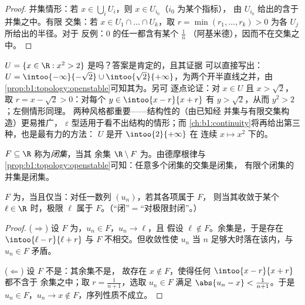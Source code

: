 \begin{proof}
并集情形：若 $x \in \bigcup_i U_i$，则 $x \in U_{i_0}$（$i_0$ 为某个指标），
由 $U_{i_0}$ 给出的含于并集之中。有限
交集：若 $x \in U_1 \cap \dots \cap U_k$，取 $r = \min(r_1,
\dots, r_k) > 0$ 为各 $U_j$ 所给出的半径。对于
反例：$0$ 的任一都含有某个 $\frac{1}{n}$
（阿基米德），因而不在交集之中。
\end{proof}

\begin{example}[用显式半径验证开性]\label{ex:b1:topology:radii}
$U = \{x \in \R : x^2 > 2\}$ 是吗？答案是肯定的，且其证据
可以直接写出：$U = \intoo{-\infty}{-\sqrt2} \cup
\intoo{\sqrt2}{+\infty}$，为两个开半直线之并，由
\cref{prop:b1:topology:openstable}可知其为。另可
逐点论证：对 $x \in U$ 且 $x > \sqrt 2$，取 $r = x -
\sqrt2 > 0$：对每个 $y \in \intoo{x - r}{x + r}$ 有 $y >
\sqrt 2$，从而 $y^2 > 2$；左侧情形同理。
两种风格都重要——结构性的（由已知经
并集与有限交集构造）更易推广，
$\varepsilon$ 型适用于看不出结构的情形；而
\cref{ch:b1:continuity}将再给出第三种，也是最有力的方法：
$U$ 是开 $\intoo{2}{+\infty}$ 在
连续 $x \mapsto x^2$ 下的。
\end{example}

\begin{definition}[闭集]\label{def:b1:topology:closed}
 $F \subseteq \R$ 称为\emph{闭集}，当其
余集 $\R \setminus F$ 为。由德摩根律与
\cref{prop:b1:topology:openstable}可知：任意多个闭集的交集是闭集，
有限个闭集的并集是闭集。
\end{definition}

\begin{theorem}[闭集的序列刻画]\label{thm:b1:topology:seqclosed}
$F$ 为，当且仅当：对任一数列 $(u_n)$，若其各项属于 $F$，
则当其收敛于某个 $\ell \in \R$ 时，极限 $\ell$ 属于
$F$。（“闭”$=$“对极限封闭”。）
\end{theorem}

\begin{proof}
($\Rightarrow$) 设 $F$ 为，$u_n \in F$，$u_n \to \ell$，且
假设 $\ell \notin F$。余集是，于是存在
$\intoo{\ell - r}{\ell + r}$ 与 $F$ 不相交。但收敛性使 $u_n$
当 $n$ 足够大时落在该内，与 $u_n \in F$ 矛盾。

($\Leftarrow$) 设 $F$ 不是：其余集不是，
故存在 $x \notin F$，使得任何 $\intoo{x - r}{x + r}$ 都不含于
余集之中；取 $r = \frac{1}{n+1}$，选取 $u_n \in F$ 满足
$\abs{u_n - x} < \frac{1}{n+1}$。于是 $u_n \in F$，$u_n \to x \notin
F$，序列性质不成立。
\end{proof}

